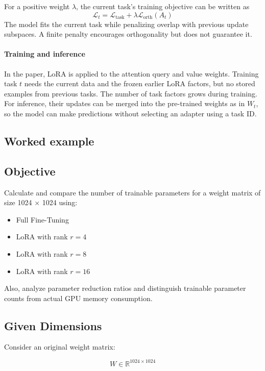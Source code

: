 For a positive weight \(\lambda\), the current task's training objective can be written as
\[
	\mathcal{L}_t =
	\mathcal{L}_{\mathrm{task}}
	+ \lambda \mathcal{L}_{\mathrm{orth}}(A_t)
\]
The model fits the current task while penalizing overlap with previous update subspaces. A finite penalty encourages orthogonality but does not guarantee it.

\paragraph{Training and inference}

In the paper, LoRA is applied to the attention query and value weights. Training task \(t\) needs the current data and the frozen earlier LoRA factors, but no stored examples from previous tasks. The number of task factors grows during training. For inference, their updates can be merged into the pre-trained weights as in \(W_t\), so the model can make predictions without selecting an adapter using a task ID.

\subsection{Worked example}

\subsection{Objective}

Calculate and compare the number of trainable parameters for a weight matrix of size 1024 × 1024 using:

\begin{itemize}
\item Full Fine-Tuning
\item LoRA with rank $r=4$
\item LoRA with rank $r=8$
\item LoRA with rank $r=16$
\end{itemize}

Also, analyze parameter reduction ratios and distinguish trainable parameter counts from actual GPU memory consumption.

\subsection{Given Dimensions}

Consider an original weight matrix:

\[
W \in \mathbb{R}^{1024 \times 1024}
\]

